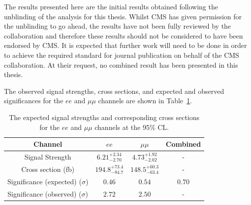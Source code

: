 
The results presented here are the initial results obtained following the unblinding of the analysis for this thesis.
Whilst CMS has given permission for the unblinding to go ahead, the results have not been fully reviewed by the collaboration and therefore these results should not be considered to have been endorsed by CMS.
It is expected that further work will need to be done in order to achieve the required standard for journal publication on behalf of the CMS collaboration.
At their request, no combined result has been presented in this thesis.

The observed signal strengths, cross sections, and expected and observed significances for the $ee$ and $\mu\mu$ channels are shown in Table~\ref{tab:shapetxs}.

\begin{table}[!h]
   \centering
   \caption{The expected signal strengths and corresponding cross sections for
   the $ee$ and $\mu\mu$ channels at the 95\% CL.}
   \begin{tabular}{cccc}
       \hline
       Channel & $ee$ & $\mu\mu$ & Combined \\
        \hline
       Signal Strength & $6.21_{-2.70}^{+2.34}$ & $4.73_{-2.02}^{+1.92}$ & - \\
       Cross section (fb) & $194.8_{-84.7}^{+73.4}$ & $148.5_{-63.4}^{+60.3}$ & - \\
       Significance (expected) ($\sigma$) & $0.46$ & $0.54$ & $0.70$\\
       Significance (observed) ($\sigma$) & $2.72$ & $2.50$ & - \\
    \end{tabular}
   \label{tab:shapetxs}
\end{table}
%


